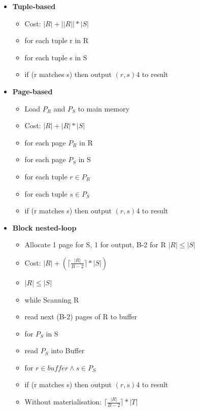\documentclass[10pt, landscape]{article}
\newcommand{\ceil}[1]{\lceil #1 \rceil}
\begin{document}
\begin{multicols}{4}
\begin{multicols}{2}
\begin{itemize}
      \item \textbf{Tuple-based} \newline
      \begin{itemize}
        \item Cost: $|R| + ||R||*|S|$
        \item for each tuple r in R 
        \item for each tuple s in S 
        \item if (r matches s) then output $(r,s)$4 to result
      \end{itemize}

      

      \item \textbf{Page-based} \newline
      \begin{itemize}
        \item Load $P_R$ and $P_S$ to main memory
        \item Cost: $|R| + |R|*|S|$
        \item for each page $P_R$ in R 
        \item for each page $P_S$ in S
        \item for each tuple $r \in P_R$
        \item for each tuple $s \in P_S$ 
        \item if (r matches s) then output $(r,s)$4 to result
      \end{itemize}


      \item \textbf{Block nested-loop} \newline
      \begin{itemize}
        \item Allocate 1 page for S, 1 for output, B-2 for R $|R| \le |S|$
        \item Cost:  $|R| + (\ceil{\frac{|R|}{B-2}} * |S|)$
        \item $|R|\le |S|$
        \item while Scanning R
        \item read next (B-2) pages of R to buffer
        \item for $P_S$ in S
        \item read $P_S$ into Buffer
        \item for $r \in buffer \land s \in P_S$
        \item if (r matches s) then output $(r,s)$4 to result
        \item Without materialisation: $\ceil{\frac{|R|}{B-2}}*|T|$
      \end{itemize}


\end{itemize}
\end{multicols}
\end{multicols}
\end{document}
